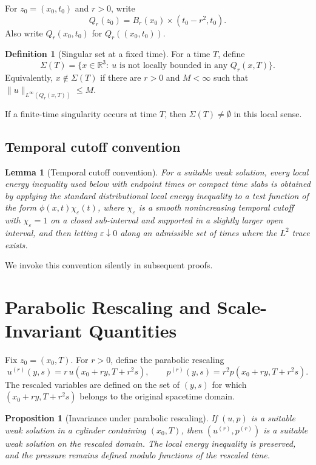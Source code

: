\documentclass[11pt]{amsart}
\theoremstyle{plain}
\newtheorem{lemma}[lemma]{Lemma}
\newtheorem{proposition}[proposition]{Proposition}
\theoremstyle{definition}
\newtheorem{definition}[definition]{Definition}
\theoremstyle{remark}
\numberwithin{equation}{section}
\begin{document}
For \(z_0=(x_0,t_0)\) and \(r>0\), write
\[
  Q_r(z_0)=B_r(x_0)\times(t_0-r^2,t_0).
\]
Also write \(Q_r(x_0,t_0)\) for \(Q_r((x_0,t_0))\).

\begin{definition}[Singular set at a fixed time]
For a time \(T\), define
\[
  \Sigma(T)=
  \{x\in\mathbb R^3:\ u\text{ is not locally bounded in any }
  Q_r(x,T)\}.
\]
Equivalently, \(x\notin\Sigma(T)\) if there are \(r>0\) and \(M<\infty\) such
that \(\|u\|_{L^\infty(Q_r(x,T))}\le M\).
\end{definition}

If a finite-time singularity occurs at time \(T\), then
\(\Sigma(T)\ne\emptyset\) in this local sense.

\subsection*{Temporal cutoff convention}

\begin{lemma}[Temporal cutoff convention]\label{p0:lem:temporal-cutoff}
For a suitable weak solution, every local energy inequality used below with
endpoint times or compact time slabs is obtained by applying the standard
distributional local energy inequality to a test function of the form
\(\phi(x,t)\chi_\varepsilon(t)\), where \(\chi_\varepsilon\) is a smooth
nonincreasing temporal cutoff with \(\chi_\varepsilon=1\) on a closed
sub-interval and supported in a slightly larger open interval, and then
letting \(\varepsilon\downarrow0\) along an admissible set of times where the
\(L^2\) trace exists.
\end{lemma}

\noindent We invoke this convention silently in subsequent proofs.

\section{Parabolic Rescaling and Scale-Invariant Quantities}

Fix \(z_0=(x_0,T)\).  For \(r>0\), define the parabolic rescaling
\[
  u^{(r)}(y,s)=r\,u(x_0+ry,T+r^2s),
  \qquad
  p^{(r)}(y,s)=r^2p(x_0+ry,T+r^2s).
\]
The rescaled variables are defined on the set of \((y,s)\) for which
\((x_0+ry,T+r^2s)\) belongs to the original spacetime domain.

\begin{proposition}[Invariance under parabolic rescaling]
If \((u,p)\) is a suitable weak solution in a cylinder containing
\((x_0,T)\), then
\((u^{(r)},p^{(r)})\) is a suitable weak solution on the rescaled domain.  The
local energy inequality is preserved, and the pressure remains defined modulo
functions of the rescaled time.
\end{proposition}
\end{document}
